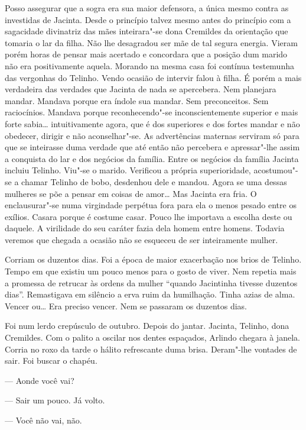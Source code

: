 \begin{linenumbers}
Posso assegurar que a sogra era sua maior defensora, a única mesmo
contra as investidas de Jacinta. Desde o princípio talvez mesmo antes do
princípio com a sagacidade divinatriz das mães inteirara"-se dona
Cremildes da orientação que tomaria o lar da filha. Não lhe desagradou
ser mãe de tal segura energia. Vieram porém horas de pensar mais
acertado e concordara que a posição dum marido não era positivamente
aquela. Morando na mesma casa foi contínua testemunha das vergonhas do
Telinho. Vendo ocasião de intervir falou à filha. É porém a mais
verdadeira das verdades que Jacinta de nada se apercebera. Nem planejara
mandar. Mandava porque era índole sua mandar. Sem preconceitos. Sem
raciocínios. Mandava porque reconhecendo"-se inconscientemente superior e
mais forte sabia\ldots{} intuitivamente agora, que é dos superiores e dos
fortes mandar e não obedecer, dirigir e não aconselhar"-se. As
advertências maternas serviram só para que se inteirasse duma verdade
que até então não percebera e apressar"-lhe assim a conquista do lar e
dos negócios da família. Entre os negócios da família Jacinta incluiu
Telinho. Viu"-se o marido. Verificou a própria superioridade,
acostumou"-se a chamar Telinho de bobo, desdenhou dele e mandou. Agora se
uma dessas mulheres se põe a pensar em coisas de amor\ldots{} Mas Jacinta era
fria. O enclausurar"-se numa virgindade perpétua fora para ela o menos
pesado entre os exílios. Casara porque é costume casar. Pouco lhe
importava a escolha deste ou daquele. A virilidade do seu caráter fazia
dela homem entre homens. Todavia veremos que chegada a ocasião não se
esqueceu de ser inteiramente mulher.

Corriam os duzentos dias. Foi a época de maior exacerbação nos brios de
Telinho. Tempo em que existiu um pouco menos para o gosto de viver. Nem
repetia mais a promessa de retrucar às ordens da mulher ``quando
Jacintinha tivesse duzentos dias''. Remastigava em silêncio a erva ruim
da humilhação. Tinha azias de alma. Vencer ou\ldots{} Era preciso vencer. Nem
se passaram os duzentos dias.

Foi num lerdo crepúsculo de outubro. Depois do jantar. Jacinta, Telinho,
dona Cremildes. Com o palito a oscilar nos dentes espaçados, Arlindo
chegara à janela. Corria no roxo da tarde o hálito refrescante duma
brisa. Deram"-lhe vontades de sair. Foi buscar o chapéu.

--- Aonde você vai?

--- Sair um pouco. Já volto.

--- Você não vai, não.


\end{linenumbers}
